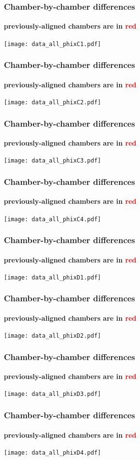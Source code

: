 \documentclass[compress]{beamer}
\begin{document}
\begin{frame}
\frametitle{Chamber-by-chamber differences}
\framesubtitle{previously-aligned chambers are in \textcolor{red}{red}}
\texttt{[image: data\_all\_phixC1.pdf]}
\end{frame}

\begin{frame}
\frametitle{Chamber-by-chamber differences}
\framesubtitle{previously-aligned chambers are in \textcolor{red}{red}}
\texttt{[image: data\_all\_phixC2.pdf]}
\end{frame}

\begin{frame}
\frametitle{Chamber-by-chamber differences}
\framesubtitle{previously-aligned chambers are in \textcolor{red}{red}}
\texttt{[image: data\_all\_phixC3.pdf]}
\end{frame}

\begin{frame}
\frametitle{Chamber-by-chamber differences}
\framesubtitle{previously-aligned chambers are in \textcolor{red}{red}}
\texttt{[image: data\_all\_phixC4.pdf]}
\end{frame}

\begin{frame}
\frametitle{Chamber-by-chamber differences}
\framesubtitle{previously-aligned chambers are in \textcolor{red}{red}}
\texttt{[image: data\_all\_phixD1.pdf]}
\end{frame}

\begin{frame}
\frametitle{Chamber-by-chamber differences}
\framesubtitle{previously-aligned chambers are in \textcolor{red}{red}}
\texttt{[image: data\_all\_phixD2.pdf]}
\end{frame}

\begin{frame}
\frametitle{Chamber-by-chamber differences}
\framesubtitle{previously-aligned chambers are in \textcolor{red}{red}}
\texttt{[image: data\_all\_phixD3.pdf]}
\end{frame}

\begin{frame}
\frametitle{Chamber-by-chamber differences}
\framesubtitle{previously-aligned chambers are in \textcolor{red}{red}}
\texttt{[image: data\_all\_phixD4.pdf]}
\end{frame}
\end{document}
